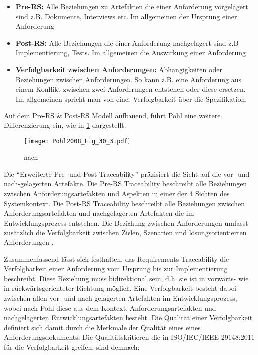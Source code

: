 \begin{itemize}
    \item \textbf{Pre-RS:} Alle Beziehungen zu Artefakten die einer Anforderung vorgelagert sind z.B. Dokumente, Interviews etc. Im allgemeinen der Ursprung einer Anforderung
    \item \textbf{Post-RS:} Alle Beziehungen die einer Anforderung nachgelagert sind z.B Implementierung, Tests. Im allgemeinen die Auswirkung einer Anforderung
    \item \textbf{Verfolgbarkeit zwischen Anforderungen:} Abhängigkeiten oder Beziehungen zwischen Anforderungen. So kann z.B. eine Anforderung aus einem Konflikt zwischen zwei Anforderungen entstehen oder diese ersetzen. Im allgemeinen spricht man von einer Verfolgbarkeit über die Spezifikation. \cite{Pohl2015BasiswissenIREB-Standard}
\end{itemize}

Auf dem Pre-RS \& Post-RS Modell aufbauend, führt Pohl eine weitere Differenzierung ein, wie in \ref{fig:abb2} dargestellt.

\begin{figure}[!htb]
  \centering
  \texttt{[image: Pohl2008\_Fig\_30\_3.pdf]}
  \caption{nach \cite[Fig. 30.3]{Pohl2008RequirementsTechniken}}
  \label{fig:abb2}
\end{figure}

Die \enquote{Erweiterte Pre- und Post-Traceability} präzisiert die Sicht auf die vor- und nach-gelagerten Artefakte. Die Pre-RS Traceability beschreibt alle Beziehungen zwischen Anforderungsartefakten und Aspekten in einer der 4 Sichten des Systemkontext. Die Post-RS Traceability beschreibt alle Beziehungen zwischen Anforderungsartefakten und nachgelagerten Artefakten die im Entwicklungsprozess entstehen. Die Beziehung zwischen Anforderungen umfasst zusätzlich die Verfolgbarkeit zwischen Zielen, Szenarien und lösungsorientierten Anforderungen \cite{Pohl2008RequirementsTechniken}.

Zusammenfassend lässt sich festhalten, das Requirements Traceability die Verfolgbarkeit einer Anforderung vom Ursprung bis zur Implementierung beschreibt. Diese Beziehung muss bidirektional sein, d.h. sie ist in vorwärts- wie in rückwärtsgerichteter Richtung möglich. Eine Verfolgbarkeit besteht dabei zwischen allen vor- und nach-gelagerten Artefakten im Entwicklungsprozess, wobei nach Pohl diese aus dem Kontext, Anforderungsartefakten und nachgelagerten Entwicklungsartefakten besteht. Die Qualität einer Verfolgbarkeit definiert sich damit durch die Merkmale der Qualität eines eines Anforderungsdokuments. Die Qualitätskritieren die in ISO/IEC/IEEE 29148:2011 für die Verfolgbarkeit greifen, sind demnach:

